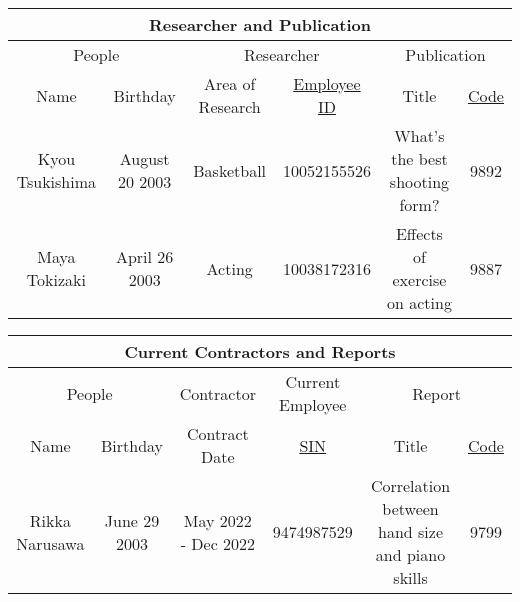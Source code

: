 \documentclass[12pt]{article}
\begin{document}
\begin{center}
    \begin{tabular}{|c|c||c|c||c | c|}
        \hline
        \multicolumn{6}{|c|}{\cellcolor{gray!25}Researcher and Publication}                                                                      \\
        \hline
        \hline
        \multicolumn{2}{|c||}{\cellcolor{gray!25}People}
                        & \multicolumn{2}{c||}{\cellcolor{gray!25}Researcher}
                        & \multicolumn{2}{c|}{\cellcolor{gray!25}Publication}                                                                    \\
        \hline
        \cellcolor{gray!25} Name
                        & \cellcolor{gray!25}Birthday
                        & \cellcolor{gray!25}Area of Research
                        & \cellcolor{gray!25}\underline{Employee ID}
                        & \cellcolor{gray!25}Title
                        & \cellcolor{gray!25}\underline{Code}                                                                                    \\
        \hline \hline
        Kyou Tsukishima & August 20 2003                                      & Basketball & 10052155526 & What's the best shooting form? & 9892 \\ \hline
        Maya Tokizaki   & April 26 2003                                       & Acting     & 10038172316 & Effects of exercise on acting  & 9887 \\ \hline
    \end{tabular}
\end{center}
\begin{center}
    \begin{tabular}{|c|c||c||c ||c| c|}
        \hline
        \multicolumn{6}{|c|}{\cellcolor{gray!25}Current Contractors and Reports}                                                                                   \\
        \hline
        \hline
        \multicolumn{2}{|c||}{\cellcolor{gray!25}People}
                       & {\cellcolor{gray!25}Contractor}
                       & {\cellcolor{gray!25}Current Employee}
                       & \multicolumn{2}{c|}{\cellcolor{gray!25}Report}                                                                                            \\
        \hline
        \cellcolor{gray!25} Name
                       & \cellcolor{gray!25}Birthday
                       & \cellcolor{gray!25}Contract Date
                       & \cellcolor{gray!25}\underline{SIN}
                       & \cellcolor{gray!25}Title
                       & \cellcolor{gray!25}\underline{Code}                                                                                                       \\
        \hline \hline
        Rikka Narusawa & June 29 2003                                   & May 2022 - Dec 2022 & 9474987529 & Correlation between hand size and piano skills & 9799 \\ \hline
    \end{tabular}
\end{center}
\end{document}
